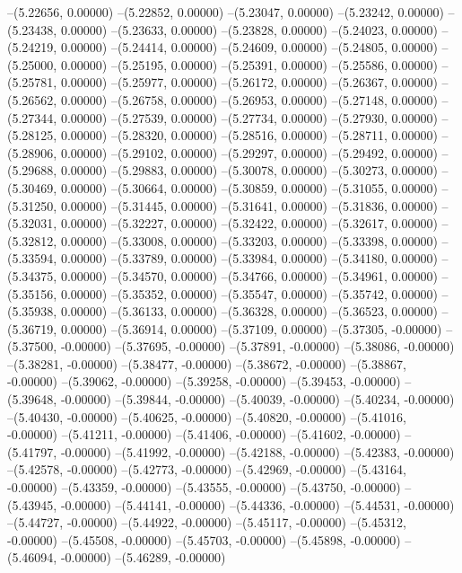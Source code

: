 --(5.22656, 0.00000)
--(5.22852, 0.00000)
--(5.23047, 0.00000)
--(5.23242, 0.00000)
--(5.23438, 0.00000)
--(5.23633, 0.00000)
--(5.23828, 0.00000)
--(5.24023, 0.00000)
--(5.24219, 0.00000)
--(5.24414, 0.00000)
--(5.24609, 0.00000)
--(5.24805, 0.00000)
--(5.25000, 0.00000)
--(5.25195, 0.00000)
--(5.25391, 0.00000)
--(5.25586, 0.00000)
--(5.25781, 0.00000)
--(5.25977, 0.00000)
--(5.26172, 0.00000)
--(5.26367, 0.00000)
--(5.26562, 0.00000)
--(5.26758, 0.00000)
--(5.26953, 0.00000)
--(5.27148, 0.00000)
--(5.27344, 0.00000)
--(5.27539, 0.00000)
--(5.27734, 0.00000)
--(5.27930, 0.00000)
--(5.28125, 0.00000)
--(5.28320, 0.00000)
--(5.28516, 0.00000)
--(5.28711, 0.00000)
--(5.28906, 0.00000)
--(5.29102, 0.00000)
--(5.29297, 0.00000)
--(5.29492, 0.00000)
--(5.29688, 0.00000)
--(5.29883, 0.00000)
--(5.30078, 0.00000)
--(5.30273, 0.00000)
--(5.30469, 0.00000)
--(5.30664, 0.00000)
--(5.30859, 0.00000)
--(5.31055, 0.00000)
--(5.31250, 0.00000)
--(5.31445, 0.00000)
--(5.31641, 0.00000)
--(5.31836, 0.00000)
--(5.32031, 0.00000)
--(5.32227, 0.00000)
--(5.32422, 0.00000)
--(5.32617, 0.00000)
--(5.32812, 0.00000)
--(5.33008, 0.00000)
--(5.33203, 0.00000)
--(5.33398, 0.00000)
--(5.33594, 0.00000)
--(5.33789, 0.00000)
--(5.33984, 0.00000)
--(5.34180, 0.00000)
--(5.34375, 0.00000)
--(5.34570, 0.00000)
--(5.34766, 0.00000)
--(5.34961, 0.00000)
--(5.35156, 0.00000)
--(5.35352, 0.00000)
--(5.35547, 0.00000)
--(5.35742, 0.00000)
--(5.35938, 0.00000)
--(5.36133, 0.00000)
--(5.36328, 0.00000)
--(5.36523, 0.00000)
--(5.36719, 0.00000)
--(5.36914, 0.00000)
--(5.37109, 0.00000)
--(5.37305, -0.00000)
--(5.37500, -0.00000)
--(5.37695, -0.00000)
--(5.37891, -0.00000)
--(5.38086, -0.00000)
--(5.38281, -0.00000)
--(5.38477, -0.00000)
--(5.38672, -0.00000)
--(5.38867, -0.00000)
--(5.39062, -0.00000)
--(5.39258, -0.00000)
--(5.39453, -0.00000)
--(5.39648, -0.00000)
--(5.39844, -0.00000)
--(5.40039, -0.00000)
--(5.40234, -0.00000)
--(5.40430, -0.00000)
--(5.40625, -0.00000)
--(5.40820, -0.00000)
--(5.41016, -0.00000)
--(5.41211, -0.00000)
--(5.41406, -0.00000)
--(5.41602, -0.00000)
--(5.41797, -0.00000)
--(5.41992, -0.00000)
--(5.42188, -0.00000)
--(5.42383, -0.00000)
--(5.42578, -0.00000)
--(5.42773, -0.00000)
--(5.42969, -0.00000)
--(5.43164, -0.00000)
--(5.43359, -0.00000)
--(5.43555, -0.00000)
--(5.43750, -0.00000)
--(5.43945, -0.00000)
--(5.44141, -0.00000)
--(5.44336, -0.00000)
--(5.44531, -0.00000)
--(5.44727, -0.00000)
--(5.44922, -0.00000)
--(5.45117, -0.00000)
--(5.45312, -0.00000)
--(5.45508, -0.00000)
--(5.45703, -0.00000)
--(5.45898, -0.00000)
--(5.46094, -0.00000)
--(5.46289, -0.00000)
